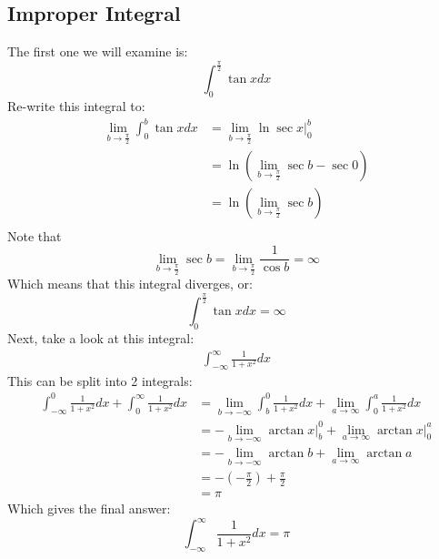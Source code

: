 \documentclass{article}
\begin{document}
\subsection{Improper Integral}
The first one we will examine is:
\[
    \int_0^{\frac{\pi}{2}} \tan x dx
\]
Re-write this integral to:
\begin{equation} \nonumber
    \begin{split}
        \lim_{b\to \frac{\pi}{2}} \int_0^b \tan x dx & = \lim_{b\to \frac{\pi}{2}} \ln \sec x \big|^{b}_{0}\\
        & = \ln (\lim_{b\to \frac{\pi}{2}} \sec b - \sec 0) \\
        & = \ln (\lim_{b\to \frac{\pi}{2}} \sec b) \\
        \end{split}
\end{equation}
Note that
\[
    \lim_{b\to \frac{\pi}{2}} \sec b =\lim_{b\to \frac{\pi}{2}} \frac{1}{\cos b} = \infty
\]
Which means that this integral diverges, or: 
\begin{equation}
    \int_0^{\frac{\pi}{2}} \tan x dx = \infty
\end{equation}
Next, take a look at this integral:
\begin{equation}\nonumber
    \begin{split}
        \int_{-\infty}^{\infty} \frac{1}{1+x^2} dx
    \end{split}
\end{equation}
This can be split into 2 integrals:
\begin{equation} \nonumber
    \begin{split}
        \int_{-\infty}^0 \frac{1}{1+x^2}dx + \int_0^{\infty} \frac{1}{1+x^2} dx & = \lim_{b \to -\infty} \int_b^0 \frac{1}{1+x^2} dx + \lim_{a\to \infty} \int_0^a \frac{1}{1+x^2} dx \\
        & = -\lim_{b\to -\infty} \arctan x \big|^0_b + \lim_{a\to \infty} \arctan x \big|^a_0 \\
        & = -\lim_{b\to -\infty} \arctan b + \lim_{a\to \infty} \arctan a \\
        & = -(-\frac{\pi}{2}) + \frac{\pi}{2} \\
        & = \pi
    \end{split}
\end{equation}
Which gives the final answer:
\begin{equation}
    \int_{-\infty}^{\infty} \frac{1}{1+x^2} dx = \pi
\end{equation}
\end{document}
